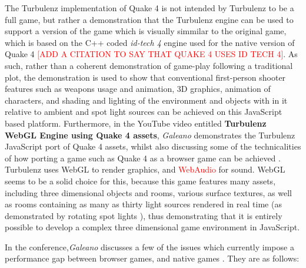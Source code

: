 The Turbulenz implementation of Quake 4 is not intended by Turbulenz to be a full game, but rather a demonstration that the Turbulenz engine can be used to support a version of the game which is visually simmilar to the original game, which is based on the C++ coded \emph{id-tech 4} engine used for the native version of Quake 4 \cite{ModDBIdTech4Download} \textcolor{red}{[ADD A CITATION TO SAY THAT QUAKE 4 USES ID TECH 4]}. As such, rather than a coherent demonstration of game-play following a traditional plot, the demonstration is used to show that conventional \gls{first-person shooter} features such as weapons usage and animation, 3D graphics, animation of characters, and shading and lighting of the environment and objects with in it relative to ambient and spot light sources can be achieved on this JavaScript based platform.
Furthermore, in the YouTube video entitled \textbf{Turbulenz WebGL Engine using Quake 4 assets}, \emph{Galeano} demonstrates the Turbulenz JavaScript port of Quake 4 assets, whilst also discussing some of the technicalities of how porting a game such as Quake 4 as a browser game can be achieved \cite{TurbulenzWebGLQuake4AssetsVideo}. Turbulenz uses WebGL to render graphics, and \textcolor{red}{WebAudio} for sound. WebGL seems to be a solid choice for this, because this game features many assets, including three dimensional objects and rooms, various surface textures, as well as rooms containing as many as thirty light sources rendered in real time (as demonstrated by rotating spot lights \cite{TurbulenzWebGLQuake4AssetsVideo}), thus demonstrating that it is entirely possible to develop a complex three dimensional game environment in JavaScript.

In the conference,\emph{Galeano} discusses a few of the issues which currently impose a performance gap between browser games, and native games \cite{GaleanoJavaScriptForGameDevelopment}. They are as follows:

